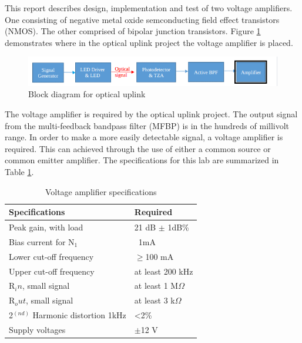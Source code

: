 




\noindent This report describes design, implementation and test of two voltage amplifiers. One consisting of negative metal oxide semconducting field effect transistors (NMOS). The other comprised of bipolar junction transistors. Figure \ref{fig:blockdiagram2} demonstrates where in the optical uplink project the voltage amplifier is placed. 


\begin{figure}[H]
    \centering
    \includegraphics[width=.9\textwidth ]{Introduction/Block_Diagram_MFBP.png}
    \caption{Block diagram for optical uplink \cite{b1}}
    \label{fig:blockdiagram2}
\end{figure}

The voltage amplifier is required by the optical uplink project. The output signal from the multi-feedback bandpass filter (MFBP) is in the hundreds of millivolt range. In order to make a more easily detectable signal, a voltage amplifier is required. This can achieved through the use of either a common source or common emitter amplifier. The specifications for this lab are summarized in Table \ref{tab:specifications}.

\begin{table}[H]
	\centering
	\caption{Voltage amplifier specifications}
	\label{tab:specifications}
	\begin{tabular}{|l|l|}
		\hline
		Specifications & Required       \\ \hline
		Peak gain, with load      & 21 dB $\pm$ 1dB\% \\ \hline
		Bias current for N$_1$     & ~1mA          \\ \hline
		Lower cut-off frequency      & $\geq$100 mA    \\ \hline
		Upper cut-off frequency    &  at least 200 kHz \\ \hline
		R$_in$, small signal       &  at least 1 M$\Omega$ \\ \hline
		R$_out$, small signal      &  at least 3 k$\Omega$ \\ \hline
		2$^(nd)$ Harmonic distortion \@ 1kHz  & <2\% \\ \hline
		Supply voltages            &  $\pm$12 V     \\  \hline
	\end{tabular}
\end{table}



